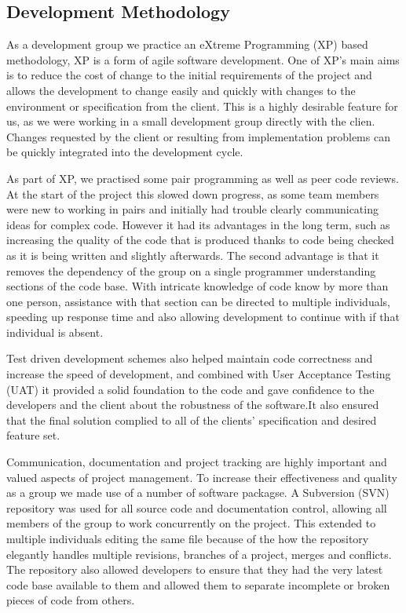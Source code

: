 \documentclass{acm_proc_article-sp}
\begin{document}
\subsection{Development Methodology}
{
As a development group we practice an eXtreme Programming (XP) based methodology, XP is a form of agile software development. One of XP's main aims is to reduce the cost of change to the initial requirements of the project and allows the development to change easily and quickly with changes to the environment or specification from the client. This is a highly desirable feature for us, as we were working in a small development group directly with the clien. Changes requested by the client or resulting from implementation problems can be quickly integrated into the development cycle.

As part of XP, we practised some pair programming as well as peer code reviews. At the start of the project this slowed down progress, as some team members were new to working in pairs and initially had trouble clearly communicating ideas for complex code. However it had its advantages in the long term, such as increasing the quality of the code that is produced thanks to code being checked as it is being written and slightly afterwards. The second advantage is that it removes the dependency of the group on a single programmer understanding sections of the code base. With intricate knowledge of code know by more than one person, assistance with that section can be directed to multiple individuals, speeding up response time and also allowing development to continue with if that individual is absent.

Test driven development schemes also helped maintain code correctness and increase the speed of development, and combined with User Acceptance Testing (UAT) it provided a solid foundation to the code and gave confidence to the developers and the client about the robustness of the software.It also ensured that the final solution complied to all of the clients' specification and desired feature set.

Communication, documentation and project tracking are highly important and valued aspects of project management. To increase their effectiveness and quality as a group we made use of a number of software packagse. A Subversion (SVN)\cite{eval:svn} repository was used for all source code and documentation control, allowing all members of the group to work concurrently on the project. This extended to multiple individuals editing the same file because of the how the repository elegantly handles multiple revisions, branches of a project, merges and conflicts. The repository also allowed developers to ensure that they had the very latest code base available to them and allowed them to separate incomplete or broken pieces of code from others.

}
\end{document}
